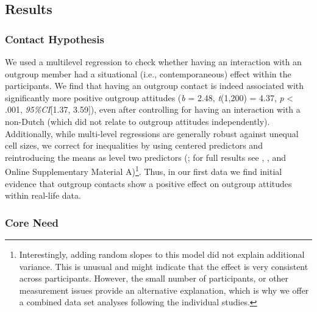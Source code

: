 \subsection{Results}

\subsubsection{Contact Hypothesis}

We used a multilevel regression to check whether having an interaction
with an outgroup member had a situational (i.e., contemporaneous) effect
within the participants. We find that having an outgroup contact is
indeed associated with significantly more positive outgroup attitudes
(\textit{b} = 2.48, \textit{t}(1,200) = 4.37, \textit{p} \textless{}
.001, \textit{95\%CI}{[}1.37, 3.59{]}), even after controlling for
having an interaction with a non-Dutch (which did not relate to outgroup
attitudes independently). Additionally, while multi-level regressions
are generally robust against unequal cell sizes, we correct for
inequalities by using centered predictors and reintroducing the means as
level two predictors (\citealp{Yaremych2021}; for full results see
, ,
and Online Supplementary Material
A)\footnote{Interestingly, adding random slopes to this model did not explain additional variance. This is unusual and might indicate that the effect is very consistent across participants. However, the small number of participants, or other measurement issues provide an alternative explanation, which is why we offer a combined data set analyses following the individual studies.}.
Thus, in our first data we find initial evidence that outgroup contacts
show a positive effect on outgroup attitudes within real-life data.

\subsubsection{Core Need}

